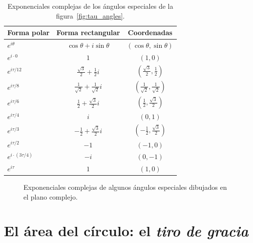 \begin{table}
\begin{center}
\begin{tabular}{lcc}
Forma polar & Forma rectangular & Coordenadas \\ \hline\hline
$e^{i\theta}$ & $\cos\theta + i\sin\theta$ & $(\cos\theta, \sin\theta)$ \\ \hline
$e^{i\cdot0}$ & $1$ & $(1, 0)$ \smallskip \\
$e^{i\tau/12}$ & $\frac{\sqrt{3}}{2} + \frac{1}{2}i$ & $(\frac{\sqrt{3}}{2}, \frac{1}{2})$ \smallskip \\
$e^{i\tau/8}$ & $\frac{1}{\sqrt{2}} +  \frac{1}{\sqrt{2}}i$ & $(\frac{1}{\sqrt{2}}, \frac{1}{\sqrt{2}})$ \smallskip \\
$e^{i\tau/6}$ & $\frac{1}{2} +\frac{\sqrt{3}}{2} i$ & $(\frac{1}{2}, \frac{\sqrt{3}}{2})$ \smallskip \\
$e^{i\tau/4}$ & $i$ & $(0, 1)$ \smallskip \\
$e^{i\tau/3}$ & $-\frac{1}{2} +\frac{\sqrt{3}}{2} i$ & $(-\frac{1}{2}, \frac{\sqrt{3}}{2})$ \smallskip \\
$e^{i\tau/2}$ & $-1$ & $(-1, 0)$ \smallskip \\
$e^{i\cdot(3\tau/4)}$ & $-i$ & $(0, -1)$ \smallskip \\
$e^{i\tau}$ & $1$ & $(1, 0)$
\end{tabular}
\end{center}
\caption{Exponenciales complejas de los ángulos especiales de la figura~\ref{fig:tau_angles}.\label{table:complex_exponentials}}
\end{table}

\begin{figure}
\begin{center}
\end{center}
\caption{Exponenciales complejas de algunos ángulos especiales dibujados en el plano complejo.\label{fig:tau_euler_circle}}
\end{figure}


\section{El área del círculo: el \emph{tiro de gracia}} %
\label{sec:circular_area}

